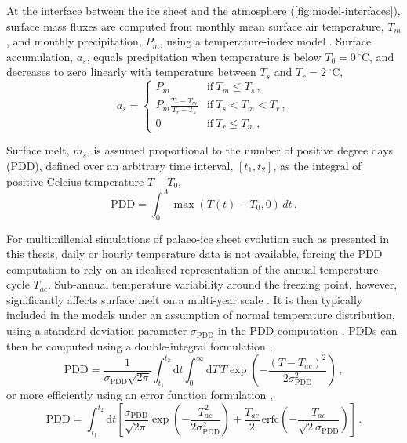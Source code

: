 \documentclass{article}
\newcommand{\PDD}[0]{\mathrm{PDD}}
\newcommand{\sPDD}[0]{\sigma_{\mathrm{PDD}}}
\newcommand{\unit}[1]{\ensuremath{\mathrm{#1}}}
\newcommand{\degree}[0]{\ensuremath{^{\circ}}}
\newcommand{\degC}[0]{\unit{{\degree}C}}
\begin{document}
At the interface between the ice sheet and the atmosphere
(\cref{fig:model-interfaces}),
surface mass fluxes are computed from monthly mean surface air temperature,
$T_m$, and monthly precipitation, $P_m$, using a temperature-index model
\citep[e.g.,][]{Hock.2003}. Surface accumulation, $a_s$, equals precipitation
when temperature is below ${T_0=0\,\degC}$, and decreases to zero linearly
with temperature between $T_s$ and ${T_r=2\,\degC}$,
\begin{equation}
    a_s =
    \begin{cases}
        P_m     & \text{if}\ T_m \le T_s \,, \\
        P_m \frac{T_r-T_m}{T_r-T_s}
                & \text{if}\ T_s < T_m < T_r \,, \\
        0       & \text{if}\ T_r \le T_m \,,
    \end{cases}
\end{equation}

Surface melt, $m_s$, is assumed proportional to the number of positive degree
days (PDD), defined over an arbitrary time interval, $[t_1, t_2]$, as the
integral of positive Celcius temperature $T-T_0$,
\begin{equation}
    \mathrm{PDD} = \int_{0}^{A}\max(T(t)-T_0,0)\,dt \,.
\end{equation}

For multimillenial simulations of palaeo-ice sheet evolution such as
presented in this thesis, daily or hourly temperature data is not available,
forcing the PDD computation to rely on an idealised representation of the
annual temperature cycle $T_{ac}$. Sub-annual temperature variability around
the freezing point, however, significantly affects surface melt on a multi-year
scale \citep{Arnold.Mackay.1964}. It is then typically included in the models
under an assumption of normal temperature distribution, using a standard
deviation parameter $\sPDD$ in the PDD computation \citep{Braithwaite.1984}.
PDDs can then be computed using a double-integral formulation
\citep{Reeh.1991},
\begin{equation}
    \PDD = \frac{1}{\sPDD\sqrt{2\pi}}
        \int_{t_1}^{t_2} \mathrm{d}t
        \int_{0}^{\infty} \mathrm{d}T \,
        T \exp\left({-\frac{(T-T_{ac})^2}{2\sPDD^2}}\right) \,,
\end{equation}
or more efficiently using an error function formulation
\citep{Calov.Greve.2005},
\begin{equation}
    \label{eqn:calovgreve}
    \PDD = \int_{t_1}^{t_2} \mathrm{d}t
        \left[\frac{\sPDD}{\sqrt{2\pi}}
                \exp\left({-\frac{T_{ac}^2}{2\sPDD^2}}\right)
              + \frac{T_{ac}}{2} \, \mathrm{erfc}
                \left(-\frac{T_{ac}}{\sqrt{2}\sPDD}\right)\right] \,.
\end{equation}
\end{document}

